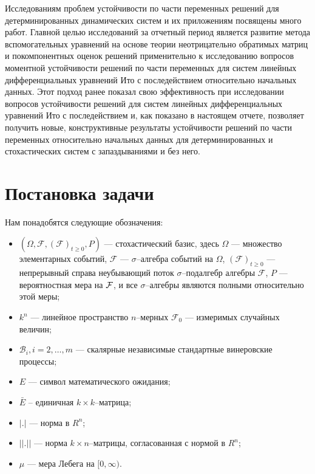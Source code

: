 Исследованиям проблем устойчивости  по части переменных  решений для
детерминированных динамических систем и их приложениям посвящены
много работ. Главной целью исследований за отчетный период является
развитие метода вспомогательных уравнений на основе теории
неотрицательно обратимых матриц и покомпонентных оценок решений
применительно к исследованию вопросов моментной устойчивости решений
по части переменных для систем линейных дифференциальных уравнений
Ито с последействием относительно начальных данных. Этот подход
ранее показал свою эффективность при исследовании вопросов
устойчивости решений для систем линейных дифференциальных уравнений
Ито с последействием и, как показано в настоящем отчете, позволяет
получить новые, конструктивные результаты устойчивости решений по
части переменных относительно начальных данных для детерминированных
и стохастических систем с запаздываниями и без него.

\section{Постановка задачи}\label{sec:kri-1}

Нам понадобятся следующие обозначения:
\begin{itemize}
    \item $(\Omega , {\mathcal F}, ({\mathcal
    F})_{t\ge0},P)$ --- стохастический базис, здесь $ \Omega $ ---
    множество
    элементарных событий, ${\mathcal F}$ --- $\sigma$--алгебра событий на
    $\Omega$,  $({\mathcal F})_{t\ge 0}$ --- непрерывный справа неубывающий поток
    $\sigma$--подалгебр алгебры ${\mathcal F}$, $P$ --- вероятностная
    мера на ${\cal F}$, и  все $\sigma$--алгебры являются полными относительно этой
    меры;
    \item $k^n$ --- линейное пространство $n$--мерных ${\mathcal F}_0$ ---
    измеримых случайных величин;
    \item $\mathcal B_i,i=2,\dots,m$ --- скалярные независимые стандартные
    винеровские процессы;
    \item  $E$ --- символ математического
    ожидания;
    \item $\bar E$ -- единичная $k \times k$--матрица;
    \item  $|.|$ --- норма в $R^n$;
    \item $||.||$
    --- норма $k\times n$--матрицы, согласованная с нормой в $R^n$;
    \item $\mu$ --- мера Лебега на $[0,\infty)$.
\end{itemize}


